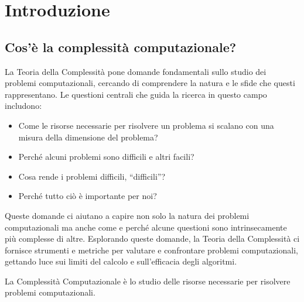 \chapter{Introduzione}
\section{Cos'è la complessità computazionale?}

La Teoria della Complessità pone domande fondamentali sullo studio dei problemi
computazionali, cercando di comprendere la natura e le sfide che questi rappresentano.
Le questioni centrali che guida la ricerca in questo campo includono:

\begin{itemize}
    \item Come le risorse necessarie per risolvere un problema si scalano con una misura
    della dimensione del problema?
    \item Perché alcuni problemi sono difficili e altri facili?
    \item Cosa rende i problemi difficili, ``difficili''?
    \item Perché tutto ciò è importante per noi?
\end{itemize}

Queste domande ci aiutano a capire non solo la natura dei problemi computazionali
ma anche come e perché alcune questioni sono intrinsecamente più complesse di altre.
Esplorando queste domande, la Teoria della Complessità ci fornisce strumenti e metriche
per valutare e confrontare problemi computazionali, gettando luce sui limiti del calcolo
e sull'efficacia degli algoritmi.

\begin{tcolorbox}[title=Definizione di Complessità Computazionale]
    La Complessità Computazionale è lo studio delle risorse necessarie per risolvere
    problemi computazionali.
\end{tcolorbox}

